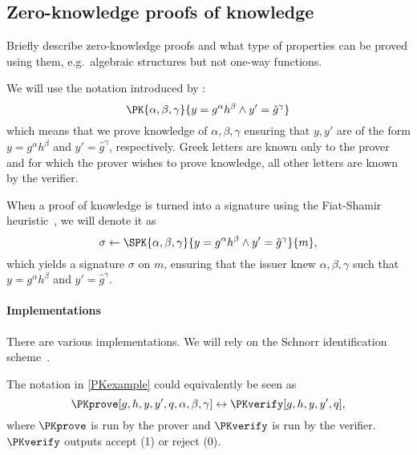\subsection{Zero-knowledge proofs of knowledge}%
\label{ZKPK}

Briefly describe zero-knowledge proofs and what type of properties can be proved 
using them, e.g.\ algebraic structures but not one-way functions.

We will use the notation introduced by \citet{PKnotation}:
\begin{equation}\label{PKexample}
  \PK{\alpha, \beta, \gamma}
  {y = g^\alpha h^\beta \land y' = \hat g^\gamma}
\end{equation}
which means that we prove knowledge of \(\alpha, \beta, \gamma\) ensuring that 
\(y, y'\) are of the form \(y = g^\alpha h^\beta\) and \(y' = \hat g^\gamma\), 
respectively.
Greek letters are known only to the prover and for which the prover wishes to 
prove knowledge, all other letters are known by the verifier.

When a proof of knowledge is turned into a signature using the Fiat-Shamir 
heuristic~\cite{FiatShamirHeuristic}, we will denote it as
\begin{equation*}\label{SPKexample}
  \sigma\gets \SPK{\alpha, \beta, \gamma}
  {y = g^\alpha h^\beta \land y' = \hat g^\gamma}
  {m},
\end{equation*}
which yields a signature \(\sigma\) on \(m\), ensuring that the issuer knew 
\(\alpha, \beta, \gamma\) such that \(y = g^\alpha h^\beta\) and \(y' = 
  \hat{g}^\gamma\).


\paragraph{Implementations}

There are various implementations.
We will rely on the Schnorr identification scheme~\cite{Schnorr}.


The notation in \cref{PKexample} could equivalently be seen as
\begin{equation*}
  \PKprove[g,h,y,y',q,\alpha,\beta,\gamma] \leftrightarrow
  \PKverify[g,h,y,y',q],
\end{equation*}
where \(\PKprove\) is run by the prover and \(\PKverify\) is run by the 
verifier.
\(\PKverify\) outputs accept (1) or reject (0).

